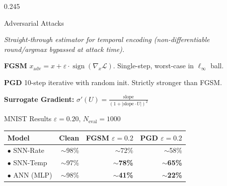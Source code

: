 \documentclass[final]{beamer}
\newcommand{\best}[1]{\textcolor{correctgreen}{\textbf{#1}}}
\newcommand{\worst}[1]{\textcolor{wrongred}{\textbf{#1}}}
\begin{document}
\begin{frame}[t]
\begin{columns}[t,totalwidth=\paperwidth]
\begin{column}{0.245\paperwidth}
\begin{block}{Adversarial Attacks}
  \begin{center}
  \end{center}
  {\footnotesize\itshape Straight-through estimator for temporal encoding
  (non-differentiable round/argmax bypassed at attack time).}

  \vspace{0.35em}
  \textbf{\color{pgdred}FGSM}\enspace
  {\small $x_\text{adv}=x+\varepsilon\!\cdot\!\operatorname{sign}(\nabla_x\mathcal{L})$.
  Single-step, worst-case in $\ell_\infty$ ball.}

  \vspace{0.2em}
  \textbf{\color{pgdred}PGD}\enspace
  {\small 10-step iterative with random init.
  Strictly stronger than FGSM.}

  \vspace{0.3em}
  \textbf{\color{accentblue}Surrogate Gradient:}
  {\small $\displaystyle\sigma'(U)=\frac{\text{slope}}{(1+|\text{slope}\cdot U|)^{2}}$}
\end{block}

\begin{block}{MNIST Results}
  {\small $\varepsilon=0.20$, $N_\text{eval}=1000$}

  \vspace{0.3em}
  {\small\setlength{\tabcolsep}{4pt}
  \begin{tabular}{@{}lrrr@{}}
    \toprule
    \textbf{Model} & \textbf{Clean}
    & \textbf{FGSM} $\varepsilon{=}0.2$ & \textbf{PGD} $\varepsilon{=}0.2$ \\
    \midrule
    {\color{snnrate}$\bullet$} SNN-Rate  & $\sim$98\% & $\sim$72\%         & $\sim$58\% \\
    {\color{snntemporal}$\bullet$} SNN-Temp& $\sim$97\%&\best{$\sim$78\%}  &\best{$\sim$65\%}\\
    {\color{anngreen}$\bullet$} ANN (MLP)& $\sim$98\% & \worst{$\sim$41\%} & \worst{$\sim$22\%}\\
    \bottomrule
  \end{tabular}}


\end{block}
\end{column}
\end{columns}
\end{frame}
\end{document}
